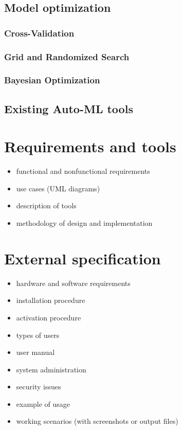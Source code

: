 \documentclass[a4paper,twoside,12pt]{book}
\begin{document}
\section{Model optimization}

\subsection{Cross-Validation}

\subsection{Grid and Randomized Search}

\subsection{Bayesian Optimization}

\section{Existing Auto-ML tools}


\chapter{Requirements and tools}

\begin{itemize}
\item functional and nonfunctional requirements
\item use cases (UML diagrams)
\item description of tools
\item methodology of design and implementation
\end{itemize}


\chapter{External specification}
\begin{itemize}
\item hardware and software requirements
\item installation procedure
\item activation procedure
\item types of users
\item user manual
\item system administration
\item security issues
\item example of usage
\item working scenarios (with screenshots or output files)
\end{itemize}
\end{document}

